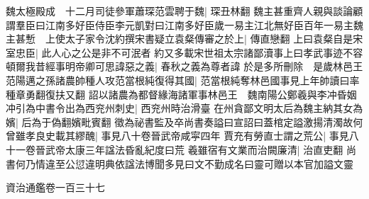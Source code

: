 魏太極殿成　十二月司徒參軍蕭琛范雲聘于魏|{
	琛丑林翻}
魏主甚重齊人親與談論顧謂羣臣曰江南多好臣侍臣李元凱對曰江南多好臣歲一易主江北無好臣百年一易主魏主甚慙　上使太子家令沈約撰宋書疑立袁粲傳審之於上|{
	傳直戀翻}
上曰袁粲自是宋室忠臣|{
	此人心之公是非不可泯者}
約又多載宋世祖太宗諸鄙瀆事上曰孝武事迹不容頓爾我昔經事明帝卿可思諱惡之義|{
	春秋之義為尊者諱}
於是多所刪除　是歲林邑王范陽邁之孫諸農帥種人攻范當根純復得其國|{
	范當根純奪林邑國事見上年帥讀曰率種章勇翻復扶又翻}
詔以諸農為都督緣海諸軍事林邑王　魏南陽公鄭羲與李冲昏姻冲引為中書令出為西兖州刺史|{
	西兖州時治滑臺}
在州貪鄙文明太后為魏主納其女為嬪|{
	后為于偽翻嬪毗賓翻}
徵為祕書監及卒尚書奏謚曰宣詔曰蓋棺定謚激揚清濁故何曾雖孝良史載其繆醜|{
	事見八十卷晉武帝咸寜四年}
賈充有勞直士謂之荒公|{
	事見八十一卷晉武帝太康三年諡法昏亂紀度曰荒}
羲雖宿有文業而治闕廉清|{
	治直吏翻}
尚書何乃情違至公愆違明典依諡法博聞多見曰文不勤成名曰靈可贈以本官加謚文靈

資治通鑑卷一百三十七
